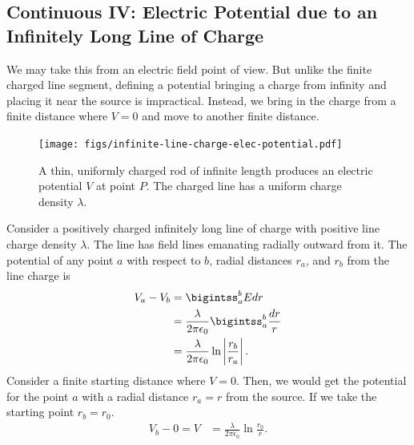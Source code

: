 \documentclass[12pt,b4paper]{article}
\begin{document}
\subsection{Continuous IV: Electric Potential due to an Infinitely Long Line of Charge}
We may take this from an electric field point of view. But unlike the finite charged line segment, defining a potential bringing a charge from infinity and placing it near the source is impractical. Instead, we bring in the charge from a finite distance where $V=0$ and move to another finite distance.
\begin{figure}[H]
    \centering
    \texttt{[image: figs/infinite-line-charge-elec-potential.pdf]}
    \caption{A thin, uniformly charged rod of infinite length produces an electric potential $V$ at point $P$. The charged line has a uniform charge density $\lambda$.}
    \label{fig:infinite-line-charge-elec-potential}
\end{figure}
Consider a positively charged infinitely long line of charge with positive line charge density $\lambda$. The line has field lines emanating radially outward from it. The potential of any point $a$ with respect to $b$, radial distances $r_a$, and $r_b$ from the line charge is
\begin{align}
    V_a-V_b&=\bigintss_a^b E dr\notag\\
    &=\frac{\lambda}{2\pi\epsilon_0}\bigintss_a^b\frac{dr}{r}\notag\\
    &=\frac{\lambda}{2\pi\epsilon_0}\ln\left|{\frac{r_b}{r_a}}\right|.
\end{align}
Consider a finite starting distance where $V=0$. Then, we would get the potential for the point $a$ with a radial distance $r_a=r$ from the source. If we take the starting point $r_b=r_0$.
\begin{align}
    V_b-0=V&=\frac{\lambda}{2\pi\epsilon_0}\ln{\frac{r_0}{r}}.
\end{align}
\end{document}
